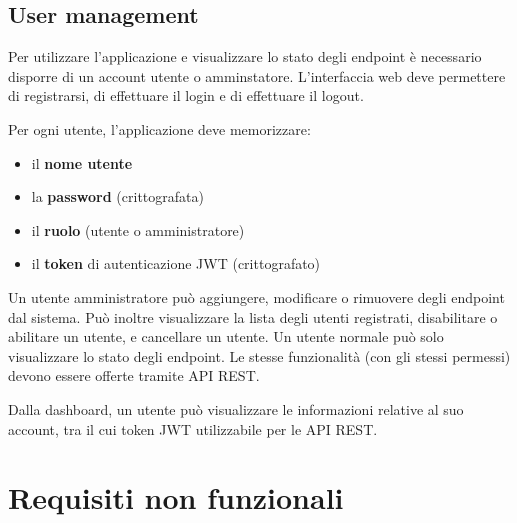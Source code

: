\documentclass{article}
\begin{document}
\subsection{User management}

Per utilizzare l'applicazione e visualizzare lo stato degli endpoint è necessario disporre di un account utente o amminstatore.
L'interfaccia web deve permettere di registrarsi, di effettuare il login e di effettuare il logout.

Per ogni utente, l'applicazione deve memorizzare:
\begin{itemize}
    \item il \textbf{nome utente}
    \item la \textbf{password} (crittografata)
    \item il \textbf{ruolo} (utente o amministratore)
    \item il \textbf{token} di autenticazione JWT (crittografato)
\end{itemize}

Un utente amministratore può aggiungere, modificare o rimuovere degli endpoint dal sistema.
Può inoltre visualizzare la lista degli utenti registrati, disabilitare o abilitare un utente, e cancellare un utente.
Un utente normale può solo visualizzare lo stato degli endpoint.
Le stesse funzionalità (con gli stessi permessi) devono essere offerte tramite API REST.

Dalla dashboard, un utente può visualizzare le informazioni relative al suo account, tra il cui token JWT utilizzabile per le API REST.










\section{Requisiti non funzionali}
\label{sec:requisiti_non_funzionali}
\end{document}
